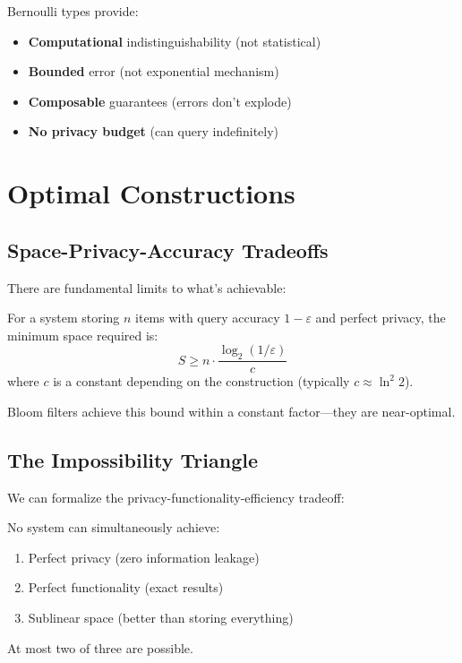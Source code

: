 \begin{proposition}
Bernoulli types provide:
\begin{itemize}
\item \textbf{Computational} indistinguishability (not statistical)
\item \textbf{Bounded} error (not exponential mechanism)
\item \textbf{Composable} guarantees (errors don't explode)
\item \textbf{No privacy budget} (can query indefinitely)
\end{itemize}
\end{proposition}

\section{Optimal Constructions}

\subsection{Space-Privacy-Accuracy Tradeoffs}

There are fundamental limits to what's achievable:

\begin{theorem}
For a system storing $n$ items with query accuracy $1-\varepsilon$ and perfect privacy, the minimum space required is:
$$S \geq n \cdot \frac{\log_2(1/\varepsilon)}{c}$$
where $c$ is a constant depending on the construction (typically $c \approx \ln^2 2$).
\end{theorem}

Bloom filters achieve this bound within a constant factor—they are near-optimal.

\subsection{The Impossibility Triangle}

We can formalize the privacy-functionality-efficiency tradeoff:

\begin{theorem}
No system can simultaneously achieve:
\begin{enumerate}
\item Perfect privacy (zero information leakage)
\item Perfect functionality (exact results)
\item Sublinear space (better than storing everything)
\end{enumerate}
At most two of three are possible.
\end{theorem}

